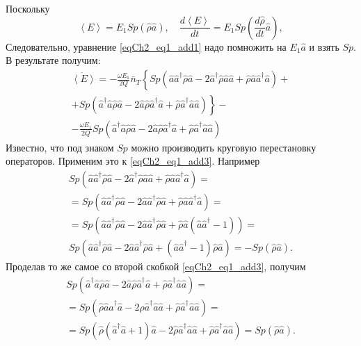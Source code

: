 Поскольку 
\begin{equation}
\left<E\right> = E_1 Sp\left(\hat{\rho}\hat{a}\right), \quad
\frac{d \left<E\right>}{d t} = E_1 Sp\left(\frac{d \hat{\rho}}{dt}\hat{a}\right),
\label{eqCh2_eq1_add2}
\end{equation}
Следовательно, уравнение \eqref{eqCh2_eq1_add1} 
надо помножить на $E_1 \hat{a}$ и взять $Sp$. В результате получим:
\begin{eqnarray}
\dot{\left<E\right>} =
- \frac{\omega E_1}{2Q}\bar{n}_T
\left\{Sp\left(\hat{a}\hat{a}^{\dag}\hat{\rho}\hat{a} - 
2 \hat{a}^{\dag}\hat{\rho}\hat{a}\hat{a} +
\hat{\rho}\hat{a}\hat{a}^{\dag}\hat{a}\right) + 
\right.
\nonumber \\
+\left.
Sp\left(\hat{a}^{\dag}\hat{a}\hat{\rho}\hat{a} - 
2 \hat{a}\hat{\rho}\hat{a}^{\dag}\hat{a}
+ \hat{\rho}\hat{a}^{\dag}\hat{a}\hat{a}
\right)
\right\}
- 
\nonumber \\
- \frac{\omega E_1}{2Q}
Sp\left(\hat{a}^{\dag}\hat{a}\hat{\rho}\hat{a} - 
2 \hat{a}\hat{\rho}\hat{a}^{\dag}\hat{a}
+ \hat{\rho}\hat{a}^{\dag}\hat{a}\hat{a}
\right)
\label{eqCh2_eq1_add3}
\end{eqnarray}
Известно, что под знаком $Sp$ можно производить круговую перестановку
операторов. Применим это к \eqref{eqCh2_eq1_add3}.
Например
\begin{eqnarray}
Sp\left(\hat{a}\hat{a}^{\dag}\hat{\rho}\hat{a} - 
2 \hat{a}^{\dag}\hat{\rho}\hat{a}\hat{a} +
\hat{\rho}\hat{a}\hat{a}^{\dag}\hat{a}\right) = 
\nonumber \\
= Sp\left(\hat{a}\hat{a}^{\dag}\hat{\rho}\hat{a} - 
2 \hat{a}\hat{a}^{\dag}\hat{\rho}\hat{a} +
\hat{\rho}\hat{a}\hat{a}^{\dag}\hat{a}\right) = 
\nonumber \\
= Sp\left(\hat{a}\hat{a}^{\dag}\hat{\rho}\hat{a} - 
2 \hat{a}\hat{a}^{\dag}\hat{\rho}\hat{a} +
\hat{\rho}\hat{a}\left(\hat{a}\hat{a}^{\dag} - 1\right)\right) = 
\nonumber \\
Sp\left(\hat{a}\hat{a}^{\dag}\hat{\rho}\hat{a} - 
2 \hat{a}\hat{a}^{\dag}\hat{\rho}\hat{a} +
\left(\hat{a}\hat{a}^{\dag} - 1\right)\hat{\rho}\hat{a}\right) = 
- Sp\left(\hat{\rho}\hat{a}\right).
\label{eqCh2_eq1_add4}
\end{eqnarray}
Проделав то же самое со второй скобкой \eqref{eqCh2_eq1_add3}, получим
\begin{eqnarray}
Sp\left(\hat{a}^{\dag}\hat{a}\hat{\rho}\hat{a} - 
2 \hat{a}\hat{\rho}\hat{a}^{\dag}\hat{a}
+ \hat{\rho}\hat{a}^{\dag}\hat{a}\hat{a} \right) = 
\nonumber \\
= 
Sp\left(\hat{\rho}\hat{a}\hat{a}^{\dag}\hat{a} - 
2 \hat{\rho}\hat{a}^{\dag}\hat{a}\hat{a}
+ \hat{\rho}\hat{a}^{\dag}\hat{a}\hat{a} \right) = 
\nonumber \\
= 
Sp\left(\hat{\rho}\left(\hat{a}^{\dag}\hat{a} + 1\right)\hat{a} - 
2 \hat{\rho}\hat{a}^{\dag}\hat{a}\hat{a}
+ \hat{\rho}\hat{a}^{\dag}\hat{a}\hat{a} \right) = 
Sp\left(\hat{\rho}\hat{a}\right).
\label{eqCh2_eq1_add5}
\end{eqnarray}
